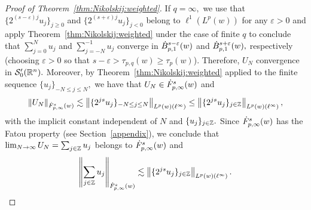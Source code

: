 \begin{proof}[Proof of  Theorem~\ref{thm:Nikolskij:weighted}]
If $q=\infty,$  we use that $\{2^{(s-\varepsilon)j}u_j\}_{j\ge 0}$ and $\{2^{(s+\varepsilon)j}u_j\}_{j< 0}$ belong to $\ell^1(L^p(w))$ for any $\varepsilon>0$ and apply Theorem~\ref{thm:Nikolskij:weighted} under the case of finite $q$ to conclude that $\sum_{j=0}^Nu_j$ and $\sum_{j=-N}^{-1}u_j$ converge in $\besw{p}{s-\varepsilon}{1}{w}$ and $\besw{p}{s+\varepsilon}{1}{w},$ respectively (choosing $\varepsilon>0$ so that $s-\varepsilon>\tau_{p,q}(w)\ge \tau_p(w)$). Therefore, $U_N$ convergence in $\mathcal{S}'_0(\rn).$ Moreover, by  Theorem~\ref{thm:Nikolskij:weighted} applied to the finite sequence $\{u_j\}_{-N\le j\le N},$ we have that $U_N\in \tlw{p}{s}{\infty}{w}$ and 
\[
\norm{U_N}{\tlw{p}{s}{\infty}{w}}\lesssim \norm{\{2^{js} u_j\}_{-N\le j\le N}}{\lebw{p}{w}(\ell^\infty)}\le \norm{\{2^{js} u_j\}_{j\in \ent}}{\lebw{p}{w}(\ell^\infty)},
\]
with the implicit constant independent of $N$ and $\{u_j\}_{j\in\ent}.$
Since $\tlw{p}{s}{\infty}{w}$ has the Fatou property (see Section~\ref{appendix}), we conclude that $\lim_{N\to \infty} U_N=\sum_{j\in\ent}u_j$ belongs to $\tlw{p}{s}{\infty}{w}$ and 
\[
\norm{\sum_{j\in\ent}u_j}{\tlw{p}{s}{\infty}{w}}\lesssim  \norm{\{2^{js} u_j\}_{j\in \ent}}{\lebw{p}{w}(\ell^\infty)}.
\]
\end{proof}
 
 
%
